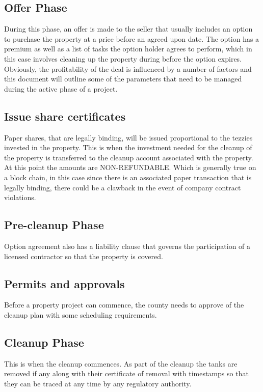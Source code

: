 \documentclass{article}
\begin{document}
\subsection{Offer Phase} \label {offer}

  During this phase, an offer is made to the seller that usually includes an option to purchase the property at a price before an agreed upon date. The option has a premium as well as a list of tasks the option holder agrees to perform, which in this case involves cleaning up the property during before the option expires. Obviously, the profitability of the deal is influenced by a number of factors and this document will outline some of the parameters that need to be managed during the active phase of a project.

  \subsection{Issue share certificates} \label {shares}

  Paper shares, that are legally binding, will be issued proportional to the tezzies invested 
  in the property. This is when the investment needed for the cleanup of the property is transferred to the cleanup account associated with the property. At this point the amounts are NON-REFUNDABLE. Which is generally true on a block chain, in this case since there is an associated paper transaction that is legally binding, there could be a clawback in the event of company contract violations.

  \subsection{Pre-cleanup Phase} \label {precleanup}
  Option agreement also has a liability clause that governs the participation of a licensed contractor so that the property is covered. 

  \subsection{Permits and approvals} \label {permits}
  Before a property project can commence, the county needs to approve of the cleanup plan with some scheduling requirements. 

  \subsection{Cleanup Phase} \label {cleanup}
  This is when the cleanup commences. As part of the cleanup the tanks are removed if any along with their certificate of removal with timestamps so that they can be traced at any time by any regulatory authority. 
\end{document}
